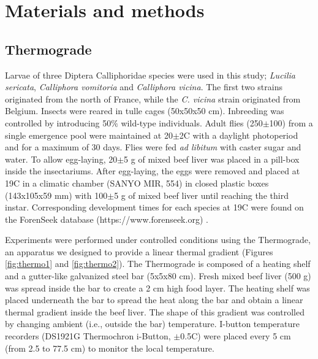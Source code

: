 	\section{Materials and methods}  
    
    	\subsection{Thermograde}
Larvae of three Diptera Calliphoridae species were used in this study; \textit{Lucilia sericata}, \textit{Calliphora vomitoria} and \textit{Calliphora vicina}. The first two strains originated from the north of France, while the \textit{C. vicina} strain originated from Belgium. Insects were reared in tulle cages (50x50x50 cm). Inbreeding was controlled by introducing 50$\%$ wild-type individuals. Adult flies (250$\pm$100) from a single emergence pool were maintained at 20$\pm$2C with a daylight photoperiod and for a maximum of 30 days. Flies were fed \textit{ad libitum} with caster sugar and water. To allow egg-laying, 20$\pm$5 g of mixed beef liver was placed in a pill-box inside the insectariums. After egg-laying, the eggs were removed and placed at 19C in a climatic chamber (SANYO MIR, 554) in closed plastic boxes (143x105x59 mm) with 100$\pm$5 g of mixed beef liver until reaching the third instar. Corresponding development times for each species at 19C were found on the ForenSeek database (https://www.forenseek.org) \citep{greenberg_flies_1991,grassberger_effect_2001,greenberg_different_1993}.

Experiments were performed under controlled conditions using the Thermograde, an apparatus we designed to provide a linear thermal gradient (Figures \ref{fig:thermo1} and \ref{fig:thermo2}). The Thermograde is composed of a heating shelf and a gutter-like galvanized steel bar (5x5x80 cm). Fresh mixed beef liver (500 g) was spread inside the bar to create a 2 cm high food layer. The heating shelf was placed underneath the bar to spread the heat along the bar and obtain a linear thermal gradient inside the beef liver. The shape of this gradient was controlled by changing ambient (i.e., outside the bar) temperature. I-button temperature recorders (DS1921G Thermochron i-Button, $\pm$0.5C) were placed every 5 cm (from 2.5 to 77.5 cm) to monitor the local temperature.

